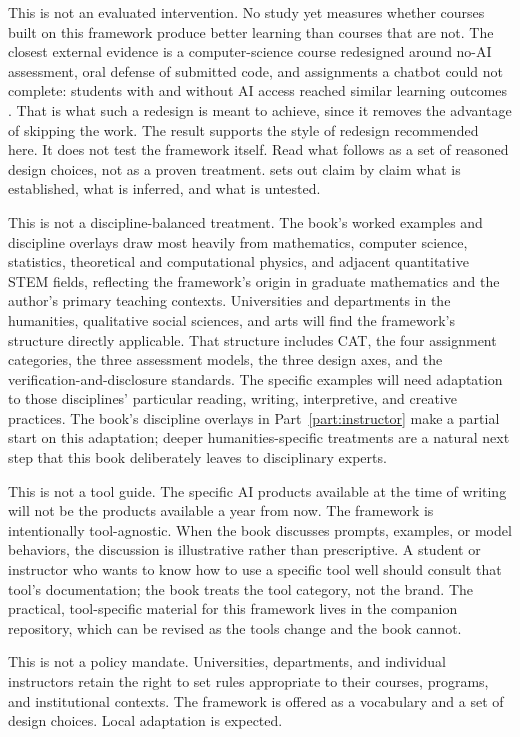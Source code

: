 \documentclass{SIAMbook2023}
\begin{document}
\begin{thepreface}
This is not an evaluated intervention. No study yet measures whether courses built on this framework produce better learning than courses that are not. The closest external evidence is a computer-science course redesigned around no-AI assessment, oral defense of submitted code, and assignments a chatbot could not complete: students with and without AI access reached similar learning outcomes \citep{kosar2024computer}. That is what such a redesign is meant to achieve, since it removes the advantage of skipping the work. The result supports the style of redesign recommended here. It does not test the framework itself. Read what follows as a set of reasoned design choices, not as a proven treatment.  sets out claim by claim what is established, what is inferred, and what is untested.

This is not a discipline-balanced treatment. The book's worked examples and discipline overlays draw most heavily from mathematics, computer science, statistics, theoretical and computational physics, and adjacent quantitative STEM fields, reflecting the framework's origin in graduate mathematics and the author's primary teaching contexts. Universities and departments in the humanities, qualitative social sciences, and arts will find the framework's structure directly applicable. That structure includes CAT, the four assignment categories, the three assessment models, the three design axes, and the verification-and-disclosure standards. The specific examples will need adaptation to those disciplines' particular reading, writing, interpretive, and creative practices. The book's discipline overlays in Part~\ref{part:instructor} make a partial start on this adaptation; deeper humanities-specific treatments are a natural next step that this book deliberately leaves to disciplinary experts.

This is not a tool guide. The specific AI products available at the time of writing will not be the products available a year from now. The framework is intentionally tool-agnostic. When the book discusses prompts, examples, or model behaviors, the discussion is illustrative rather than prescriptive. A student or instructor who wants to know how to use a specific tool well should consult that tool's documentation; the book treats the tool category, not the brand. The practical, tool-specific material for this framework lives in the companion repository, which can be revised as the tools change and the book cannot.

This is not a policy mandate. Universities, departments, and individual instructors retain the right to set rules appropriate to their courses, programs, and institutional contexts. The framework is offered as a vocabulary and a set of design choices. Local adaptation is expected.


\end{thepreface}
\end{document}
